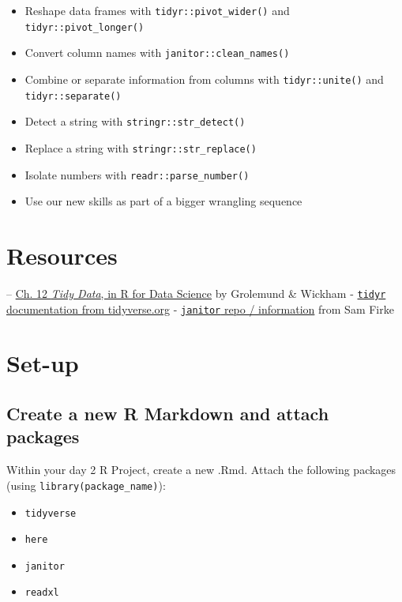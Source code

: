 \documentclass[]{book}
\providecommand{\tightlist}{%
  \setlength{\itemsep}{0pt}\setlength{\parskip}{0pt}}
\begin{document}
\begin{itemize}
\tightlist
\item
  Reshape data frames with \texttt{tidyr::pivot\_wider()} and \texttt{tidyr::pivot\_longer()}
\item
  Convert column names with \texttt{janitor::clean\_names()}
\item
  Combine or separate information from columns with \texttt{tidyr::unite()} and \texttt{tidyr::separate()}
\item
  Detect a string with \texttt{stringr::str\_detect()}
\item
  Replace a string with \texttt{stringr::str\_replace()}
\item
  Isolate numbers with \texttt{readr::parse\_number()}
\item
  Use our new skills as part of a bigger wrangling sequence
\end{itemize}

\hypertarget{resources-5}{%
\section{Resources}\label{resources-5}}

-- \href{https://r4ds.had.co.nz/tidy-data.html}{Ch. 12 \emph{Tidy Data}, in R for Data Science} by Grolemund \& Wickham
- \href{https://tidyr.tidyverse.org/}{\texttt{tidyr} documentation from tidyverse.org}
- \href{https://github.com/sfirke/janitor}{\texttt{janitor} repo / information} from Sam Firke

\hypertarget{set-up}{%
\section{Set-up}\label{set-up}}

\hypertarget{create-a-new-r-markdown-and-attach-packages}{%
\subsection{Create a new R Markdown and attach packages}\label{create-a-new-r-markdown-and-attach-packages}}

Within your day 2 R Project, create a new .Rmd. Attach the following packages (using \texttt{library(package\_name)}):

\begin{itemize}
\tightlist
\item
  \texttt{tidyverse}
\item
  \texttt{here}
\item
  \texttt{janitor}
\item
  \texttt{readxl}
\end{itemize}
\end{document}
